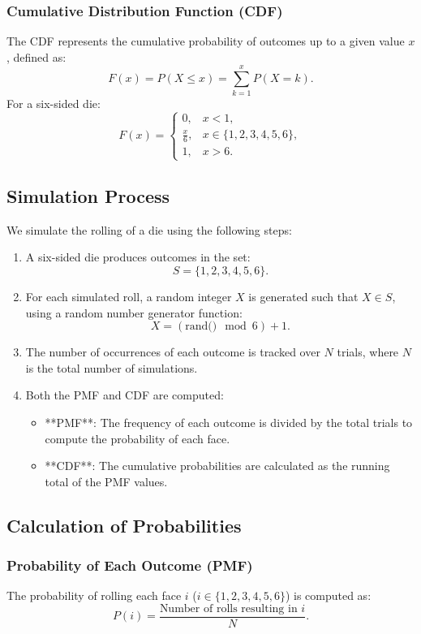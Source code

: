 \documentclass[journal]{IEEEtran}
\begin{document}
\subsubsection*{Cumulative Distribution Function (CDF)}
The CDF represents the cumulative probability of outcomes up to a given value \( x \), defined as:
\[
F(x) = P(X \leq x) = \sum_{k=1}^{x} P(X = k).
\]
For a six-sided die:
\[
F(x) = 
\begin{cases} 
0, & x < 1, \\
\frac{x}{6}, & x \in \{1, 2, 3, 4, 5, 6\}, \\
1, & x > 6.
\end{cases}
\]

\subsection*{Simulation Process}
We simulate the rolling of a die using the following steps:
\begin{enumerate}
    \item A six-sided die produces outcomes in the set:
    \[
    S = \{1, 2, 3, 4, 5, 6\}.
    \]
    \item For each simulated roll, a random integer \( X \) is generated such that \( X \in S \), using a random number generator function:
    \[
    X = (\text{rand()} \mod 6) + 1.
    \]
    \item The number of occurrences of each outcome is tracked over \( N \) trials, where \( N \) is the total number of simulations.
    \item Both the PMF and CDF are computed:
    \begin{itemize}
        \item **PMF**: The frequency of each outcome is divided by the total trials to compute the probability of each face.
        \item **CDF**: The cumulative probabilities are calculated as the running total of the PMF values.
    \end{itemize}
\end{enumerate}

\subsection*{Calculation of Probabilities}
\subsubsection*{Probability of Each Outcome (PMF)}
The probability of rolling each face \( i \) (\( i \in \{1, 2, 3, 4, 5, 6\} \)) is computed as:
\[
P(i) = \frac{\text{Number of rolls resulting in } i}{N}.
\]
\end{document}
